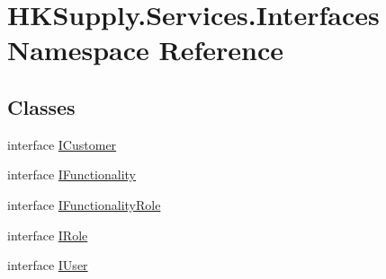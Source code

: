 \hypertarget{namespace_h_k_supply_1_1_services_1_1_interfaces}{}\section{H\+K\+Supply.\+Services.\+Interfaces Namespace Reference}
\label{namespace_h_k_supply_1_1_services_1_1_interfaces}
\subsection*{Classes}
\begin{DoxyCompactItemize}
\item 
interface \hyperlink{interface_h_k_supply_1_1_services_1_1_interfaces_1_1_i_customer}{I\+Customer}
\item 
interface \hyperlink{interface_h_k_supply_1_1_services_1_1_interfaces_1_1_i_functionality}{I\+Functionality}
\item 
interface \hyperlink{interface_h_k_supply_1_1_services_1_1_interfaces_1_1_i_functionality_role}{I\+Functionality\+Role}
\item 
interface \hyperlink{interface_h_k_supply_1_1_services_1_1_interfaces_1_1_i_role}{I\+Role}
\item 
interface \hyperlink{interface_h_k_supply_1_1_services_1_1_interfaces_1_1_i_user}{I\+User}
\end{DoxyCompactItemize}
